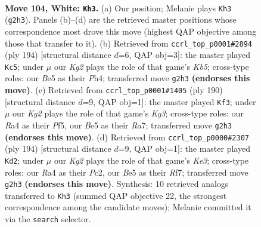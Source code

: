 \documentclass[11pt]{article}
\begin{document}
\clearpage

\begin{figure}[p]\centering
\begin{subfigure}{0.46\textwidth}\centering
\resizebox{\linewidth}{!}{%
\newchessgame
\chessboard[
  setfen={5r2/8/7k/4B3/R7/P7/6K1/8 w - - 0 104},
  showmover=false,
  pgfstyle=straightmove, color=movearrow, markmove={g2-h3}
]}
\caption{}
\end{subfigure}\hfill
\begin{subfigure}{0.46\textwidth}\centering
\resizebox{\linewidth}{!}{%
\newchessgame
\chessboard[
  setfen={1R6/1P4k1/8/1K6/7P/8/1r6/8 w - - 7 98},
  showmover=false,
  pgfstyle=straightmove, color=movearrow, markmove={b5-c5}
]}
\caption{}
\end{subfigure}
\\[4pt]
\begin{subfigure}{0.46\textwidth}\centering
\resizebox{\linewidth}{!}{%
\newchessgame
\chessboard[
  setfen={8/R7/5p1k/5P2/1r6/6K1/8/8 w - - 4 96},
  showmover=false,
  pgfstyle=straightmove, color=movearrow, markmove={g3-f3}
]}
\caption{}
\end{subfigure}\hfill
\begin{subfigure}{0.46\textwidth}\centering
\resizebox{\linewidth}{!}{%
\newchessgame
\chessboard[
  setfen={8/P4R2/8/4k3/r7/4K3/2P5/8 w - - 81 98},
  showmover=false,
  pgfstyle=straightmove, color=movearrow, markmove={e3-d2}
]}
\caption{}
\end{subfigure}
\caption{\textbf{Move 104, White: \texttt{Kh3}.} (a) Our position; Melanie plays \texttt{Kh3} (\texttt{g2h3}). Panels (b)--(d) are the retrieved master positions whose correspondence most drove this move (highest QAP objective among those that transfer to it). (b) Retrieved from \texttt{ccrl\_top\_p0001\#2894} (ply 194) [structural distance $d$=6, QAP obj=3]: the master played \texttt{Kc5}; under $\mu$ our \emph{Kg2} plays the role of that game's \emph{Kb5}; cross-type roles: our \emph{B}e5 as their \emph{P}h4; transferred move \texttt{g2h3} \textbf{(endorses this move)}. (c) Retrieved from \texttt{ccrl\_top\_p0001\#1405} (ply 190) [structural distance $d$=9, QAP obj=1]: the master played \texttt{Kf3}; under $\mu$ our \emph{Kg2} plays the role of that game's \emph{Kg3}; cross-type roles: our \emph{R}a4 as their \emph{P}f5, our \emph{B}e5 as their \emph{R}a7; transferred move \texttt{g2h3} \textbf{(endorses this move)}. (d) Retrieved from \texttt{ccrl\_top\_p0000\#2307} (ply 194) [structural distance $d$=9, QAP obj=1]: the master played \texttt{Kd2}; under $\mu$ our \emph{Kg2} plays the role of that game's \emph{Ke3}; cross-type roles: our \emph{R}a4 as their \emph{P}c2, our \emph{B}e5 as their \emph{R}f7; transferred move \texttt{g2h3} \textbf{(endorses this move)}. Synthesis: 10 retrieved analogs transferred to \texttt{Kh3} (summed QAP objective 22, the strongest correspondence among the candidate moves); Melanie committed it via the \texttt{search} selector.}
\label{fig:thought-m206}
\end{figure}
\end{document}
